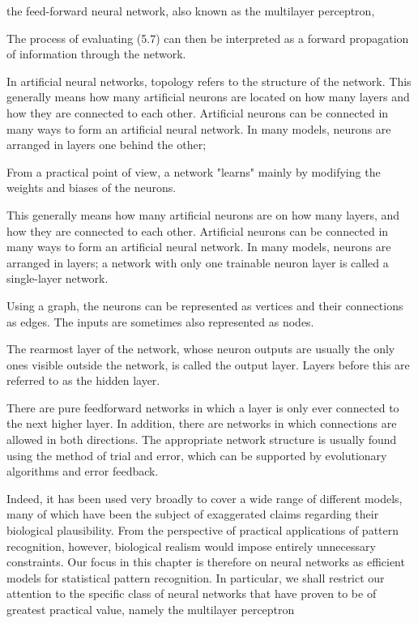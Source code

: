 the feed-forward neural network, also known as the multilayer perceptron,

The process of evaluating (5.7) can then be interpreted as a forward
propagation of information through the network.

In artificial neural networks, topology refers to the structure of the network. This generally means how many artificial neurons are located on how many layers and how they are connected to each other. Artificial neurons can be connected in many ways to form an artificial neural network. In many models, neurons are arranged in layers one behind the other; 

From a practical point of view, a network "learns" mainly by modifying the weights and biases of the neurons.


This generally means how many artificial neurons are on how many layers, and how they are connected to each other. Artificial neurons can be connected in many ways to form an artificial neural network. In many models, neurons are arranged in layers; a network with only one trainable neuron layer is called a single-layer network.

Using a graph, the neurons can be represented as vertices and their connections as edges. The inputs are sometimes also represented as nodes.

The rearmost layer of the network, whose neuron outputs are usually the only ones visible outside the network, is called the output layer. Layers before this are referred to as the hidden layer.

There are pure feedforward networks in which a layer is only ever connected to the next higher layer. In addition, there are networks in which connections are allowed in both directions. The appropriate network structure is usually found using the method of trial and error, which can be supported by evolutionary algorithms and error feedback.


Indeed,
it has been used very broadly to cover a wide range of different models, many of
which have been the subject of exaggerated claims regarding their biological plausibility. From the perspective of practical applications of pattern recognition, however, biological realism would impose entirely unnecessary constraints. Our focus in
this chapter is therefore on neural networks as efficient models for statistical pattern
recognition. In particular, we shall restrict our attention to the specific class of neural networks that have proven to be of greatest practical value, namely the multilayer
perceptron

